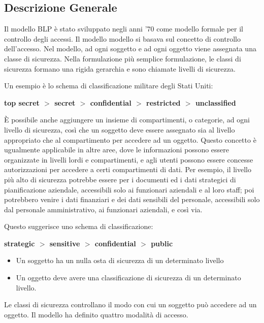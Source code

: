 \subsection{Descrizione Generale}
Il modello BLP è stato sviluppato negli anni '70 come modello formale per il controllo degli accessi. Il modello modello si basava sul concetto di controllo dell'accesso. Nel modello, ad ogni soggetto e ad ogni oggetto viene assegnata una classe di sicurezza. Nella formulazione più semplice formulazione, le classi di sicurezza formano una rigida gerarchia e sono chiamate livelli di sicurezza.

\singlespacing

Un esempio è lo schema di classificazione militare degli Stati Uniti:

\begin{center}
    \textbf{top secret $>$ secret $>$ confidential $>$ restricted $>$ unclassified}
\end{center}

È possibile anche aggiungere un insieme di compartimenti, o categorie, ad ogni livello di sicurezza, così che un soggetto deve essere assegnato sia al livello appropriato che al compartimento per accedere ad un oggetto. Questo concetto è ugualmente applicabile in altre aree, dove le informazioni possono essere organizzate in livelli lordi e compartimenti, e agli utenti possono essere concesse autorizzazioni per accedere a certi compartimenti di dati. Per esempio, il livello più alto di sicurezza potrebbe essere per i documenti ed i dati strategici di pianificazione aziendale, accessibili solo ai funzionari aziendali e al loro staff; poi potrebbero venire i dati finanziari e dei dati sensibili del personale, accessibili solo dal personale amministrativo, ai funzionari aziendali, e così via.

\singlespacing

Questo suggerisce uno schema di classificazione:

\begin{center}
    \textbf{strategic $>$ sensitive $>$ confidential $>$ public}
\end{center}

\begin{itemize}

    \item Un soggetto ha un nulla osta di sicurezza di un determinato livello
    
    \item Un oggetto deve avere una classificazione di sicurezza di un determinato livello.
    
\end{itemize}
Le classi di sicurezza controllano il modo con cui un soggetto può accedere ad un oggetto. Il modello ha definito quattro modalità di accesso.

